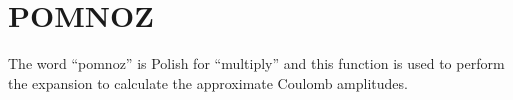 \section{POMNOZ}
\label{sect:pomnoz}

\noindent The word ``pomnoz'' is Polish for ``multiply'' and this function is used to perform
the expansion to calculate the approximate Coulomb amplitudes.\\

